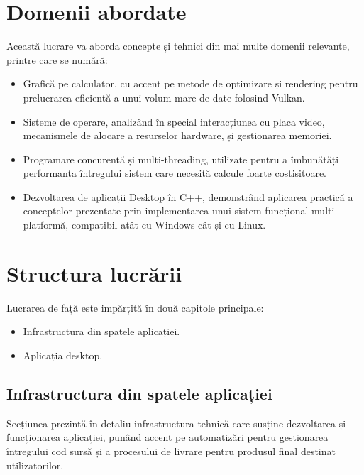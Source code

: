 \section{Domenii abordate}
Această lucrare va aborda concepte și tehnici din mai multe domenii relevante, printre care se numără:
\begin{itemize}
    \item Grafică pe calculator, cu accent pe metode de optimizare și rendering pentru prelucrarea eficientă a unui volum mare de date folosind Vulkan.
    \item Sisteme de operare, analizând în special interacțiunea cu placa video, mecanismele de alocare a resurselor hardware, și gestionarea memoriei.
    \item Programare concurentă și multi-threading, utilizate pentru a îmbunătăți performanța întregului sistem care necesită calcule foarte costisitoare.
    \item Dezvoltarea de aplicații Desktop în C++, demonstrând aplicarea practică a conceptelor prezentate prin implementarea unui sistem funcțional multi-platformă, compatibil atât cu Windows cât și cu Linux.
\end{itemize}

\section{Structura lucrării}
Lucrarea de față este impărțită în două capitole principale:
\begin{itemize}
    \item Infrastructura din spatele aplicației.
    \item Aplicația desktop.
\end{itemize}

    \subsection{Infrastructura din spatele aplicației}
    Secțiunea prezintă în detaliu infrastructura tehnică care susține dezvoltarea și funcționarea aplicației, punând accent pe automatizări pentru gestionarea întregului cod sursă și a procesului de livrare pentru produsul final destinat utilizatorilor. 
    
